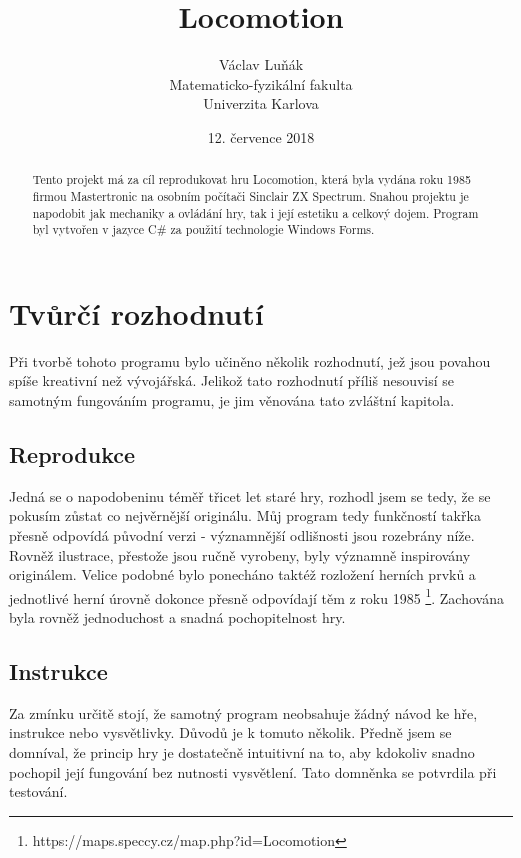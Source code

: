 \documentclass[11pt,a4paper]{scrreprt}
\begin{document}
\title{Locomotion}
\author{Václav Luňák\\ Matematicko-fyzikální fakulta\\ Univerzita Karlova}
\date{12. července 2018}
\maketitle

\begin{abstract}
Tento projekt má za cíl reprodukovat hru Locomotion, která byla vydána roku 1985 firmou Mastertronic na osobním počítači Sinclair ZX Spectrum. Snahou projektu je napodobit jak mechaniky a ovládání hry, tak i její estetiku a celkový dojem. Program byl vytvořen v jazyce C\# za použití technologie Windows Forms.
\end{abstract}

\tableofcontents

\chapter{Tvůrčí rozhodnutí}
Při tvorbě tohoto programu bylo učiněno několik rozhodnutí, jež jsou povahou spíše kreativní než vývojářská. Jelikož tato rozhodnutí příliš nesouvisí se samotným fungováním programu, je jim věnována tato zvláštní kapitola.

\section{Reprodukce}
Jedná se o napodobeninu téměř třicet let staré hry, rozhodl jsem se tedy, že se pokusím zůstat co nejvěrnější originálu. Můj program tedy funkčností takřka přesně odpovídá původní verzi - významnější odlišnosti jsou rozebrány níže. Rovněž ilustrace, přestože jsou ručně vyrobeny, byly významně inspirovány originálem. Velice podobné bylo ponecháno taktéž rozložení herních prvků a jednotlivé herní úrovně dokonce přesně odpovídají těm z roku 1985 \footnote{https://maps.speccy.cz/map.php?id=Locomotion}. Zachována byla rovněž jednoduchost a snadná pochopitelnost hry.

\section{Instrukce}
Za zmínku určitě stojí, že samotný program neobsahuje žádný návod ke hře, instrukce nebo vysvětlivky. Důvodů je k tomuto několik. Předně jsem se domníval, že princip hry je dostatečně intuitivní na to, aby kdokoliv snadno pochopil její fungování bez nutnosti vysvětlení. Tato domněnka se potvrdila při testování. \\
\end{document}
